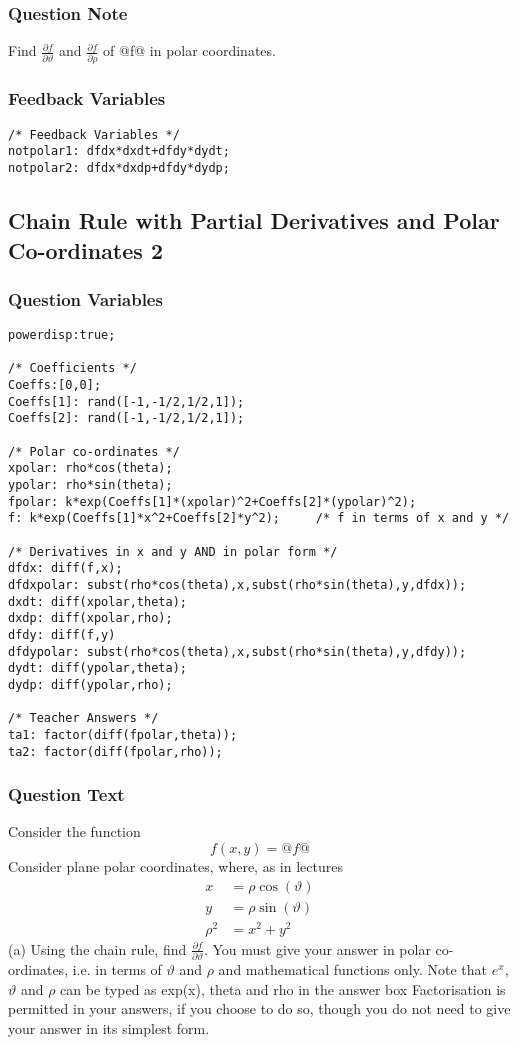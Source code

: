 \documentclass[a4paper,10pt]{article}
\begin{document}
\subsubsection{Question Note}
Find \( \frac{\partial f}{\partial \vartheta} \) and \( \frac{\partial f}{\partial \rho} \) of @f@ in polar coordinates.
\subsubsection{Feedback Variables}
\begin{lstlisting}
/* Feedback Variables */
notpolar1: dfdx*dxdt+dfdy*dydt;
notpolar2: dfdx*dxdp+dfdy*dydp;
\end{lstlisting}

\subsection{Chain Rule with Partial Derivatives and Polar Co-ordinates 2}
\subsubsection{Question Variables}
\begin{lstlisting}
powerdisp:true;

/* Coefficients */
Coeffs:[0,0];
Coeffs[1]: rand([-1,-1/2,1/2,1]);
Coeffs[2]: rand([-1,-1/2,1/2,1]);

/* Polar co-ordinates */
xpolar: rho*cos(theta);
ypolar: rho*sin(theta);
fpolar: k*exp(Coeffs[1]*(xpolar)^2+Coeffs[2]*(ypolar)^2);
f: k*exp(Coeffs[1]*x^2+Coeffs[2]*y^2);     /* f in terms of x and y */

/* Derivatives in x and y AND in polar form */
dfdx: diff(f,x);
dfdxpolar: subst(rho*cos(theta),x,subst(rho*sin(theta),y,dfdx));
dxdt: diff(xpolar,theta);
dxdp: diff(xpolar,rho);
dfdy: diff(f,y)
dfdypolar: subst(rho*cos(theta),x,subst(rho*sin(theta),y,dfdy));
dydt: diff(ypolar,theta);
dydp: diff(ypolar,rho);

/* Teacher Answers */
ta1: factor(diff(fpolar,theta));
ta2: factor(diff(fpolar,rho));
\end{lstlisting}
\subsubsection{Question Text}
Consider the function \[f(x,y) = @f@\]Consider plane polar coordinates, where, as in lectures \begin{align*} x&=\rho\cos(\vartheta) \\ y&=\rho\sin(\vartheta) \\ \rho^2&=x^2+y^2 \end{align*}
(a) Using the chain rule, find \( \frac{\partial f}{\partial \vartheta} \). You must give your answer in polar co-ordinates, i.e. in terms of \(\vartheta\) and $\rho$ and mathematical functions only. Note that $e^{x}$, \(\vartheta\) and \(\rho\) can be typed as exp(x), theta and rho in the answer box Factorisation is permitted in your answers, if you choose to do so, though you do not need to give your answer in its simplest form.
\end{document}
